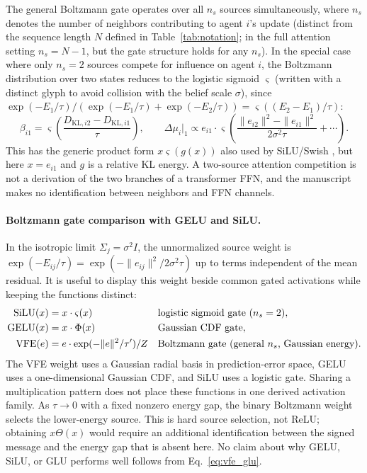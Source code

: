 \documentclass[twoside,11pt]{article}
\begin{document}
The general Boltzmann gate operates over all $n_s$ sources simultaneously, where $n_s$ denotes the number of neighbors contributing to agent $i$'s update (distinct from the sequence length $N$ defined in Table~\ref{tab:notation}; in the full attention setting $n_s = N-1$, but the gate structure holds for any $n_s$). In the special case where only $n_s = 2$ sources compete for influence on agent $i$, the Boltzmann distribution over two states reduces to the logistic sigmoid $\varsigma$ (written with a distinct glyph to avoid collision with the belief scale $\sigma$), since $\exp(-E_1/\tau)/(\exp(-E_1/\tau) + \exp(-E_2/\tau)) = \varsigma((E_2 - E_1)/\tau)$:
%
\begin{equation}
\beta_{i1} = \varsigma \left(\frac{D_{\mathrm{KL},i2} - D_{\mathrm{KL},i1}}{\tau}\right),
\qquad
\Delta\mu_i\big|_1 \propto e_{i1} \cdot \varsigma \left(\frac{\|e_{i2}\|^2 - \|e_{i1}\|^2}{2\sigma^2\tau} + \cdots\right).
\label{eq:binary_silu}
\end{equation}
%
This has the generic product form $x\varsigma(g(x))$ also used by SiLU/Swish \citep{ramachandran2018searching}, but here $x=e_{i1}$ and $g$ is a relative KL energy. A two-source attention competition is not a derivation of the two branches of a transformer FFN, and the manuscript makes no identification between neighbors and FFN channels.

\paragraph{Boltzmann gate comparison with GELU and SiLU.}

In the isotropic limit $\Sigma_j = \sigma^2 I$, the unnormalized source weight is $\exp(-E_{ij}/\tau) = \exp(-\|e_{ij}\|^2 / 2\sigma^2\tau)$ up to terms independent of the mean residual. It is useful to display this weight beside common gated activations while keeping the functions distinct:
%
\begin{align}
\text{SiLU}(x) &= x \cdot \varsigma(x) && \text{logistic sigmoid gate ($n_s = 2$)}, \notag \\
\text{GELU}(x) &= x \cdot \Phi(x) && \text{Gaussian CDF gate}, \label{eq:activation_comparison} \\
\text{VFE}(e) &= e \cdot \exp(-\|e\|^2/\tau')/Z && \text{Boltzmann gate (general $n_s$, Gaussian energy)}. \notag
\end{align}
%
The VFE weight uses a Gaussian radial basis in prediction-error space, GELU uses a one-dimensional Gaussian CDF, and SiLU uses a logistic gate. Sharing a multiplication pattern does not place these functions in one derived activation family. As $\tau\to0$ with a fixed nonzero energy gap, the binary Boltzmann weight selects the lower-energy source. This is hard source selection, not ReLU; obtaining $x\Theta(x)$ would require an additional identification between the signed message and the energy gap that is absent here. No claim about why GELU, SiLU, or GLU performs well follows from Eq.~\eqref{eq:vfe_glu}.
\end{document}
